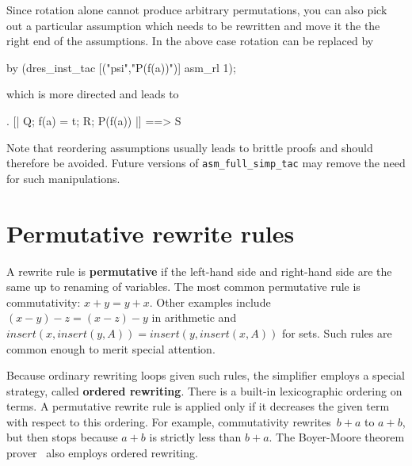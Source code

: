 Since rotation alone cannot produce arbitrary permutations, you can also pick
out a particular assumption which needs to be rewritten and move it the the
right end of the assumptions. In the above case rotation can be replaced by
\begin{ttbox}
by (dres_inst_tac [("psi","P(f(a))")] asm_rl 1);
\end{ttbox}
which is more directed and leads to
\begin{ttbox}
{. [| Q; f(a) = t; R; P(f(a)) |] ==> S}
\end{ttbox}

Note that reordering assumptions usually leads to brittle proofs and should
therefore be avoided. Future versions of \verb$asm_full_simp_tac$ may remove
the need for such manipulations.

\section{Permutative rewrite rules}

A rewrite rule is {\bf permutative} if the left-hand side and right-hand
side are the same up to renaming of variables.  The most common permutative
rule is commutativity: $x+y = y+x$.  Other examples include $(x-y)-z =
(x-z)-y$ in arithmetic and $insert(x,insert(y,A)) = insert(y,insert(x,A))$
for sets.  Such rules are common enough to merit special attention.

Because ordinary rewriting loops given such rules, the simplifier employs a
special strategy, called {\bf ordered rewriting}.
There is a built-in lexicographic ordering on terms.  A permutative rewrite
rule is applied only if it decreases the given term with respect to this
ordering.  For example, commutativity rewrites~$b+a$ to $a+b$, but then
stops because $a+b$ is strictly less than $b+a$.  The Boyer-Moore theorem
prover~\cite{bm88book} also employs ordered rewriting.

